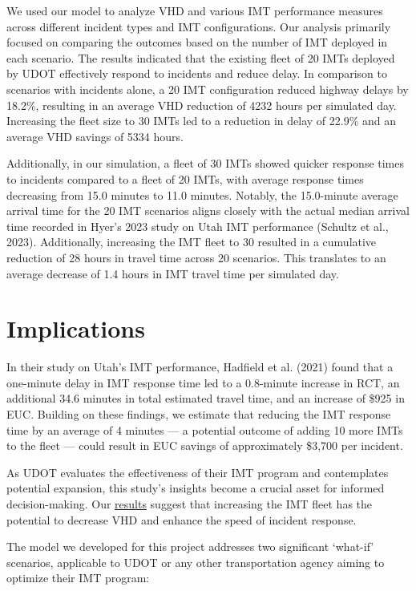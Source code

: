 \documentclass[fancy, oneside, mastersfancy, ms]{byuthesis}
\begin{document}
We used our model to analyze VHD and various IMT performance measures
across different incident types and IMT configurations. Our analysis
primarily focused on comparing the outcomes based on the number of IMT
deployed in each scenario. The results indicated that the existing fleet
of 20 IMTs deployed by UDOT effectively respond to incidents and reduce
delay. In comparison to scenarios with incidents alone, a 20 IMT
configuration reduced highway delays by 18.2\%, resulting in an average
VHD reduction of 4232 hours per simulated day. Increasing the fleet size
to 30 IMTs led to a reduction in delay of 22.9\% and an average VHD
savings of 5334 hours.

Additionally, in our simulation, a fleet of 30 IMTs showed quicker
response times to incidents compared to a fleet of 20 IMTs, with average
response times decreasing from 15.0 minutes to 11.0 minutes. Notably,
the 15.0-minute average arrival time for the 20 IMT scenarios aligns
closely with the actual median arrival time recorded in Hyer's 2023
study on Utah IMT performance (Schultz et al., 2023). Additionally,
increasing the IMT fleet to 30 resulted in a cumulative reduction of 28
hours in travel time across 20 scenarios. This translates to an average
decrease of 1.4 hours in IMT travel time per simulated day.

\hypertarget{sec-implications}{%
\section{Implications}\label{sec-implications}}

In their study on Utah's IMT performance, Hadfield et al. (2021) found
that a one-minute delay in IMT response time led to a 0.8-minute
increase in RCT, an additional 34.6 minutes in total estimated travel
time, and an increase of \$925 in EUC. Building on these findings, we
estimate that reducing the IMT response time by an average of 4 minutes
--- a potential outcome of adding 10 more IMTs to the fleet --- could
result in EUC savings of approximately \$3,700 per incident.

As UDOT evaluates the effectiveness of their IMT program and
contemplates potential expansion, this study's insights become a crucial
asset for informed decision-making. Our
\protect\hyperlink{sec-results}{results} suggest that increasing the IMT
fleet has the potential to decrease VHD and enhance the speed of
incident response.

The model we developed for this project addresses two significant
`what-if' scenarios, applicable to UDOT or any other transportation
agency aiming to optimize their IMT program:
\end{document}
